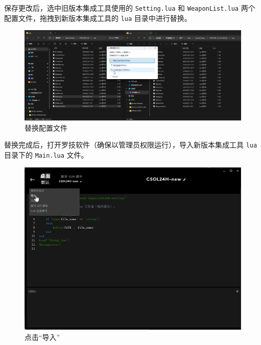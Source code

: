 保存更改后，选中旧版本集成工具使用的 \lstinline{Setting.lua} 和 \lstinline{WeaponList.lua} 两个配置文件，拖拽到新版本集成工具的 \lstinline{lua} 目录中进行替换。

\begin{figure}[H]
    \Centering
    \includegraphics[width=\textwidth]{docs/assets/update/replace_03.png}
    \caption{替换配置文件}
\end{figure}

替换完成后，打开罗技软件（确保以管理员权限运行），导入新版本集成工具 \lstinline{lua} 目录下的 \lstinline{Main.lua} 文件。

\begin{figure}[H]
    \Centering
    \includegraphics[width=\textwidth]{docs/assets/update/import_main_00.png}
    \caption{点击“导入”}
\end{figure}

